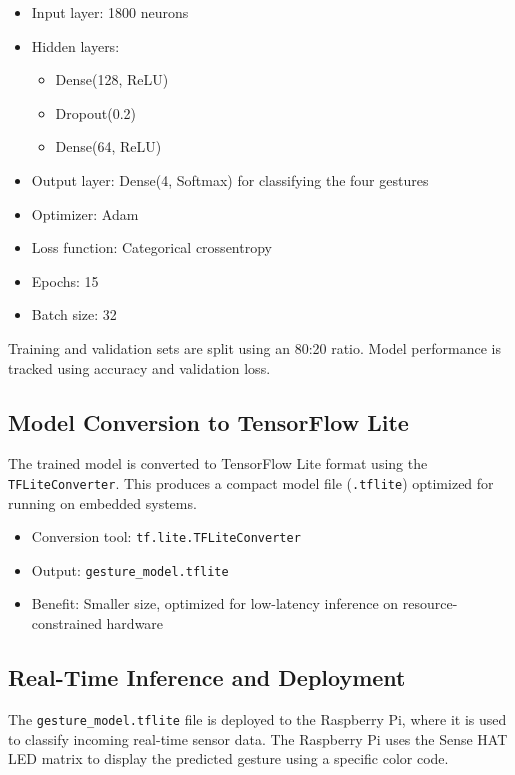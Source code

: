 \documentclass[a4paper,12pt]{article}
\begin{document}
\begin{itemize}
    \item Input layer: 1800 neurons
    \item Hidden layers:
    \begin{itemize}
        \item Dense(128, ReLU)
        \item Dropout(0.2)
        \item Dense(64, ReLU)
    \end{itemize}
    \item Output layer: Dense(4, Softmax) for classifying the four gestures
    \item Optimizer: Adam
    \item Loss function: Categorical crossentropy
    \item Epochs: 15
    \item Batch size: 32
\end{itemize}

Training and validation sets are split using an 80:20 ratio. Model performance is tracked using accuracy and validation loss.

\subsection{Model Conversion to TensorFlow Lite}

The trained model is converted to TensorFlow Lite format using the \texttt{TFLiteConverter}. This produces a compact model file (\texttt{.tflite}) optimized for running on embedded systems.

\begin{itemize}
    \item Conversion tool: \texttt{tf.lite.TFLiteConverter}
    \item Output: \texttt{gesture\_model.tflite}
    \item Benefit: Smaller size, optimized for low-latency inference on resource-constrained hardware
\end{itemize}

\subsection{Real-Time Inference and Deployment}

The \texttt{gesture\_model.tflite} file is deployed to the Raspberry Pi, where it is used to classify incoming real-time sensor data. The Raspberry Pi uses the Sense HAT LED matrix to display the predicted gesture using a specific color code.
\end{document}
